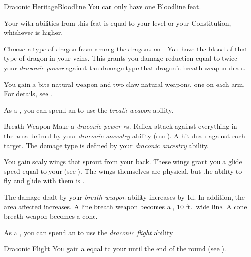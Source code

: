     \begin{feat}{Draconic Heritage}{Bloodline}
         You can only have one Bloodline feat.

         Your  with abilities from this feat is equal to your level or your Constitution, whichever is higher.

         Choose a type of dragon from among the dragons on .
        You have the blood of that type of dragon in your veins.
        This grants you damage reduction equal to twice your \textit{draconic power} against the damage type that dragon's breath weapon deals.

         You gain a bite natural weapon and two claw natural weapons, one on each arm.
        For details, see .

         As a , you can spend an  to use the \textit{breath weapon} ability.
        \begin{ability}{Breath Weapon}
            Make a \textit{draconic power} vs. Reflex attack against everything in the area defined by your \textit{draconic ancestry} ability (see ).
            A hit deals  against each target.
            The damage type is defined by your \textit{draconic ancestry} ability.
        \end{ability}

         You gain scaly wings that sprout from your back.
        These wings grant you a glide speed equal to your  (see ).
        The wings themselves are physical, but the ability to fly and glide with them is .

         The damage dealt by your \textit{breath weapon} ability increases by \plus1d.
        In addition, the area affected increases.
        A line breath weapon becomes a \areahuge, 10 ft.\ wide line.
        A cone breath weapon becomes a \arealarge cone.

         As a , you can spend an  to use the \textit{draconic flight} ability.
        \begin{ability}{Draconic Flight}
            You gain a  equal to your  until the end of the round (see ).
        \end{ability}


\end{feat}
